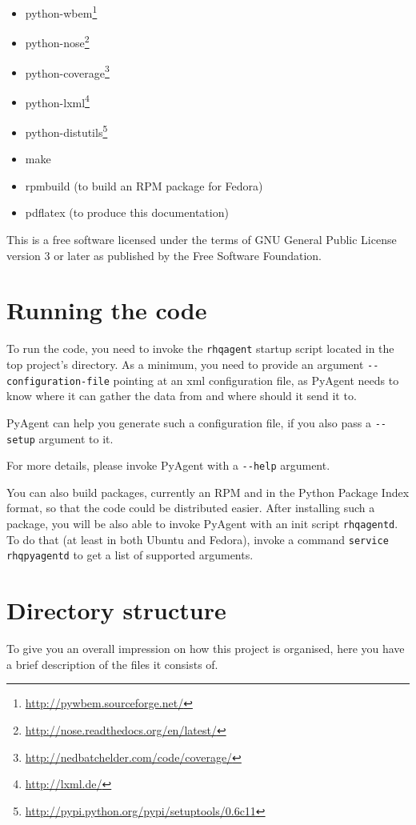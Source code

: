 \documentclass[a4paper,twoside,11pt]{article}
\begin{document}
		\begin{itemize}
			\item python-wbem\footnote{\href{http://pywbem.sourceforge.net/}{http://pywbem.sourceforge.net/}}
			\item python-nose\footnote{\href{http://nose.readthedocs.org/en/latest/}{http://nose.readthedocs.org/en/latest/}}
			\item python-coverage\footnote{\href{http://nedbatchelder.com/code/coverage/}{http://nedbatchelder.com/code/coverage/}}
			\item python-lxml\footnote{\href{http://lxml.de/}{http://lxml.de/}}
			\item python-distutils\footnote{\href{http://pypi.python.org/pypi/setuptools/0.6c11}{http://pypi.python.org/pypi/setuptools/0.6c11}}
			\item make
			\item rpmbuild (to build an RPM package for Fedora)
			\item pdflatex (to produce this documentation)
		\end{itemize}

		This is a free software licensed under the terms of GNU General Public License version 3 or later as published by the Free Software Foundation.

	\section{Running the code}
		To run the code, you need to invoke the \texttt{rhqagent} startup script located in the top project's directory. As a minimum, you need to provide an argument \texttt{-{}-configuration-file} pointing at an xml configuration file, as PyAgent needs to know where it can gather the data from and where should it send it to.

		PyAgent can help you generate such a configuration file, if you also pass a \texttt{-{}-setup} argument to it.

		For more details, please invoke PyAgent with a \texttt{-{}-help} argument.

		You can also build packages, currently an RPM and in the Python Package Index format, so that the code could be distributed easier. After installing such a package, you will be also able to invoke PyAgent with an init script \texttt{rhqagentd}. To do that (at least in both Ubuntu and Fedora), invoke a command \texttt{service rhqpyagentd} to get a list of supported arguments.

	\section{Directory structure}
		To give you an overall impression on how this project is organised, here you have a brief description of the files it consists of.
\end{document}
